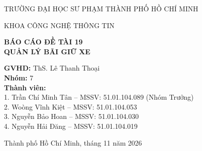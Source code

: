 \documentclass[12pt,a4paper]{report}
\begin{document}
\begin{titlepage}
  \centering
  {\large TRƯỜNG ĐẠI HỌC SƯ PHẠM THÀNH PHỐ HỒ CHÍ MINH\par}
  {\large KHOA CÔNG NGHỆ THÔNG TIN\par}
  \vspace{2.5cm}
  {\huge\bfseries BÁO CÁO ĐỀ TÀI 19\\[0.5cm] QUẢN LÝ BÃI GIỮ XE\par}
  \vspace{2cm}
  \begin{flushleft}
  \hspace{3cm}\textbf{GVHD:} ThS. Lê Thanh Thoại\\[0.3cm]
  \hspace{3cm}\textbf{Nhóm:} 7\\[0.3cm]
  \hspace{3cm}\textbf{Thành viên:}\\
  \hspace{3.5cm}1. Trần Chí Minh Tân  -- MSSV: 51.01.104.089 (Nhóm Trưởng)\\
  \hspace{3.5cm}2. Woòng Vĩnh Kiệt    -- MSSV: 51.01.104.053\\
  \hspace{3.5cm}3. Nguyễn Bảo Hoan    -- MSSV: 51.01.104.030\\
  \hspace{3.5cm}4. Nguyễn Hải Đăng    -- MSSV: 51.01.104.019\\
  \end{flushleft}
  \vfill
  {\large Thành phố Hồ Chí Minh, tháng 11 năm 2026\par}
\end{titlepage}

\tableofcontents
\listoffigures
\listoftables
\clearpage
{}












\appendix

\end{document}
